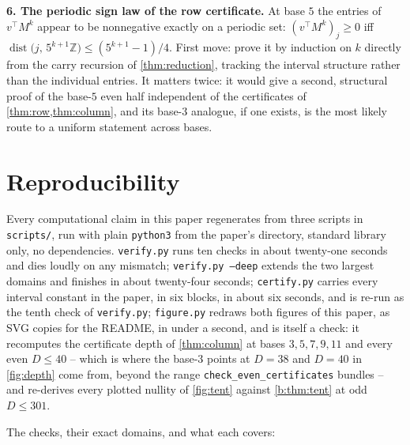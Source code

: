 \documentclass[11pt]{amsart}
\theoremstyle{definition}
\theoremstyle{remark}
\begin{document}
\textbf{6. The periodic sign law of the row certificate.} At base $5$ the entries of $v^{\top}M^k$ appear to be nonnegative exactly on a periodic set: $(v^{\top}M^k)_j \ge 0$ iff $\operatorname{dist}\bigl(j,\, 5^{k+1}\mathbb{Z}\bigr) \le (5^{k+1}-1)/4$. First move: prove it by induction on $k$ directly from the carry recursion of \cref{thm:reduction}, tracking the interval structure rather than the individual entries. It matters twice: it would give a second, structural proof of the base-$5$ even half independent of the certificates of \cref{thm:row,thm:column}, and its base-$3$ analogue, if one exists, is the most likely route to a uniform statement across bases.

\section{Reproducibility}
\label{sec:repro}

Every computational claim in this paper regenerates from three scripts in \texttt{scripts/}, run with plain \texttt{python3} from the paper's directory, standard library only, no dependencies. \texttt{verify.py} runs ten checks in about twenty-one seconds and dies loudly on any mismatch; \texttt{verify.py --deep} extends the two largest domains and finishes in about twenty-four seconds; \texttt{certify.py} carries every interval constant in the paper, in six blocks, in about six seconds, and is re-run as the tenth check of \texttt{verify.py}; \texttt{figure.py} redraws both figures of this paper, as SVG copies for the README, in under a second, and is itself a check: it recomputes the certificate depth of \cref{thm:column} at bases $3, 5, 7, 9, 11$ and every even $D \le 40$ -- which is where the base-$3$ points at $D = 38$ and $D = 40$ in \cref{fig:depth} come from, beyond the range \texttt{check\_even\_certificates} bundles -- and re-derives every plotted nullity of \cref{fig:tent} against \cref{b:thm:tent} at odd $D \le 301$.

The checks, their exact domains, and what each covers:
\end{document}
